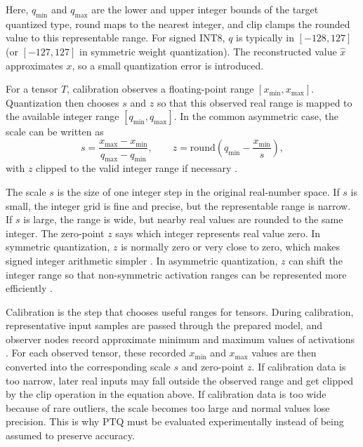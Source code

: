 Here, \(q_{\min}\) and \(q_{\max}\) are the lower and upper integer bounds of the
target quantized type, \(\mathrm{round}\) maps to the nearest integer, and
\(\mathrm{clip}\) clamps the rounded value to this representable range. For
signed INT8, $q$ is typically in $[-128,127]$ (or $[-127,127]$ in symmetric
weight quantization). The reconstructed value $\hat{x}$ approximates $x$, so a
small quantization error is introduced.

For a tensor $T$, calibration observes a floating-point range
\([x_{\min}, x_{\max}]\). Quantization then chooses $s$ and $z$ so that this
observed real range is mapped to the available integer range
\([q_{\min}, q_{\max}]\). In the common asymmetric case, the scale can be written
as
\begin{equation}
s = \frac{x_{\max}-x_{\min}}{q_{\max}-q_{\min}},
\qquad
z = \mathrm{round}\!\left(q_{\min} - \frac{x_{\min}}{s}\right),
\end{equation}
with $z$ clipped to the valid integer range if necessary
\cite{jacob2018quantization,krishnamoorthi2018quantizing}.

The scale $s$ is the size of one integer step in the original real-number
space. If $s$ is small, the integer grid is fine and precise, but the
representable range is narrow. If $s$ is large, the range is wide, but nearby
real values are rounded to the same integer. The zero-point $z$ says which
integer represents real value zero. In symmetric quantization, $z$ is normally
zero or very close to zero, which makes signed integer arithmetic simpler
\cite{jacob2018quantization}. In asymmetric quantization, $z$ can shift the
integer range so that non-symmetric activation ranges can be represented more
efficiently \cite{krishnamoorthi2018quantizing}.

Calibration is the step that chooses useful ranges for tensors. During
calibration, representative input samples are passed through the prepared model,
and observer nodes record approximate minimum and maximum values of activations
\cite{torchao_pt2e}. For each observed tensor, these recorded
\(x_{\min}\) and \(x_{\max}\) values are then converted into the corresponding
scale $s$ and zero-point $z$. If calibration data is too narrow, later real inputs may fall
outside the observed range and get clipped by the \(\mathrm{clip}\) operation
in the equation above. If calibration data is too wide because of rare outliers,
the scale becomes too large and normal values lose precision. This is why PTQ
must be evaluated experimentally instead of being
assumed to preserve accuracy.

